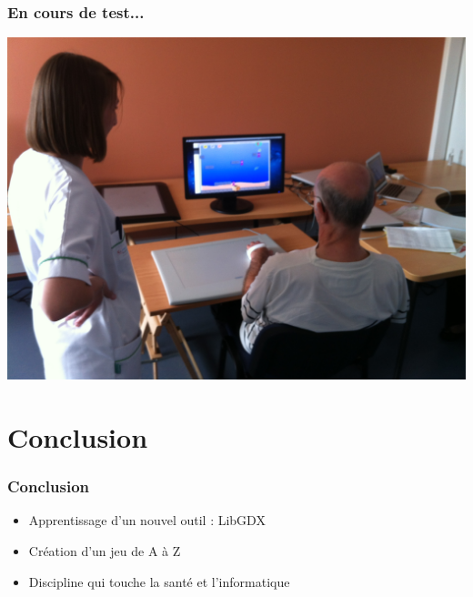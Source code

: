\documentclass{beamer}
\begin{document}
\begin{frame}
\frametitle{En cours de test...}
\begin{center}
\includegraphics[scale=0.08]{images/test.JPG}
\end{center}
\end{frame}

\section{Conclusion}
\begin{frame}
\frametitle{Conclusion}
\begin{itemize}
\item Apprentissage d'un nouvel outil : LibGDX
\item Création d'un jeu de A à Z
\item Discipline qui touche la santé et l'informatique
\end{itemize}
\end{frame}
\end{document}

